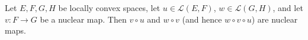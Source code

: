 Let $E, F, G, H$ be locally convex spaces, let $u \in \mathcal{L}(E, F)$, $w \in \mathcal{L}(G, H)$, and let $v: F \to G$ be a nuclear map. Then $v \circ u$ and $w \circ v$ (and hence $w \circ v \circ u$) are nuclear maps.

